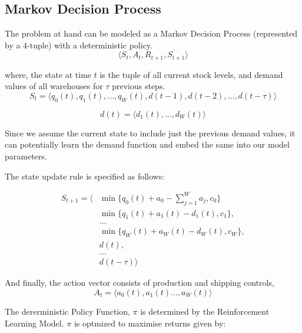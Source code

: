 \documentclass{article}
\begin{document}
\subsection{Markov Decision Process}

The problem at hand can be modeled as a Markov Decision Process (represented by a 4-tuple) with a deterministic policy.
\begin{equation}
    \langle S_t, A_t, R_{t+1}, S_{t+1} \rangle 
\end{equation}


where, the state at time $t$ is the tuple of all current stock levels, and demand values of all warehouses for $\tau$ previous steps.
\begin{equation}
    S_t = \langle q_0(t), q_1(t), ..., q_W(t), d(t-1), d(t-2), ..., d(t-\tau) \rangle
\end{equation}

\begin{equation}
    d(t) = \langle d_1(t), ..., d_W(t) \rangle
\end{equation}

Since we assume the current state to include just the previous demand values, it can potentially learn the demand function and embed the same into our model parameters.

The state update rule is specified as follows: 

\begin{equation}
    \begin{split}
    S_{t+1} = \langle & \min \{ q_0(t) + a_0 - \sum_{j = 1}^W a_j, c_0 \} \\
                      & \min \{ q_1(t) + a_1(t) - d_1(t), c_1 \}, \\
                      & ... \\
                      & \min \{ q_W(t) + a_W(t) - d_W(t), c_W \}, \\
                      & d(t), \\
                      & ... \\
                      & d(t - \tau) \rangle
    \end{split} 
\end{equation}

And finally, the action vector consists of production and shipping controls,
\begin{equation}
    A_t = \langle a_0(t), a_1(t) ..., a_W(t) \rangle \label{eq:action_fmt}
\end{equation}

The dererministic Policy Function, \( \pi \) is determined by the Reinforcement Learning Model. \( \pi \) is optmized to maximise returns given by:
\end{document}
